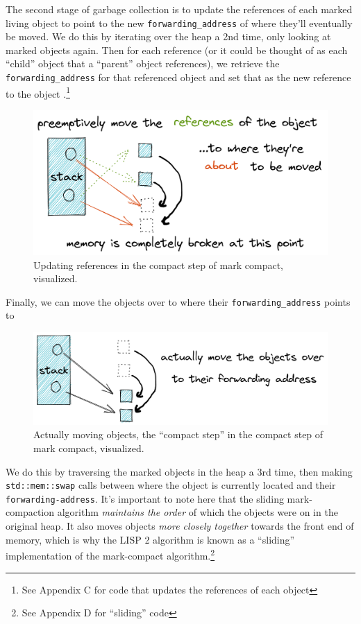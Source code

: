 \documentclass[index]{subfiles}
\begin{document}
The second stage of garbage collection is to update the references of each marked living object to point to the new \verb+forwarding_address+ of where they'll eventually be moved. We do this by iterating over the heap a 2nd time, only looking at marked objects again. Then for each reference (or it could be thought of as each ``child'' object that a ``parent'' object references), we retrieve the \verb+forwarding_address+ for that referenced object and set that as the new reference to the object \cites[Chapter 3]{gc_handbook}[Sec.~3.4]{redhat_openjdk}.\footnote{See Appendix C for code that updates the references of each object}

\begin{figure}[H]
    \centering
    \includegraphics[scale=0.3]{pics/update-references.png}
    \caption{Updating references in the compact step of mark compact, visualized.}
\end{figure}

Finally, we can move the objects over to where their \verb+forwarding_address+ points to

\begin{figure}[H]
    \centering
    \includegraphics[scale=0.25]{pics/actually-move.png}
    \caption{Actually moving objects, the ``compact step'' in the compact step of mark compact, visualized.}
\end{figure}

We do this by traversing the marked objects in the heap a 3rd time, then making \texttt{std::mem::swap} calls between where the object is currently located and their \verb+forwarding-address+. It's important to note here that the sliding mark-compaction algorithm \textit{maintains the order} of which the objects were on in the original heap. It also moves objects \textit{more closely together} towards the front end of memory, which is why the LISP 2 algorithm is known as a ``sliding'' implementation of the mark-compact algorithm.\footnote{See Appendix D for ``sliding'' code}
\end{document}

